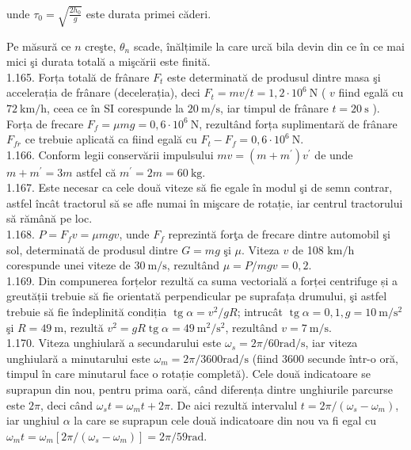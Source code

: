 unde $\tau_{0}=\sqrt{\frac{2 h_{0}}{g}}$ este durata primei căderi.

Pe măsură ce $n$ creşte, $\theta_{n}$ scade, înălțimile la care urcă bila devin din ce în ce mai mici şi durata totală a mişcării este finită.\\
1.165. Forța totală de frânare $F_{t}$ este determinată de produsul dintre masa şi accelerația de frânare (decelerația), deci $F_{t}=m v / t=1,2 \cdot 10^{6} \mathrm{~N}$ ( $v$ fiind egală cu $72 \mathrm{~km} / \mathrm{h}$, ceea ce în SI corespunde la $20 \mathrm{~m} / \mathrm{s}$, iar timpul de frânare $t=20 \mathrm{~s}$ ). Forța de frecare $F_{f}=\mu m g=0,6 \cdot 10^{6} \mathrm{~N}$, rezultând forța suplimentară de frânare $F_{f r}$ ce trebuie aplicată ca fiind egală cu $F_{t}-F_{f}=0,6 \cdot 10^{6} \mathrm{~N}$.\\
1.166. Conform legii conservării impulsului $m v=\left(m+m^{\prime}\right) v^{\prime}$ de unde $m+m^{\prime}=3 m$ astfel că $m^{\prime}=2 m=60 \mathrm{~kg}$.\\
1.167. Este necesar ca cele două viteze să fie egale în modul şi de semn contrar, astfel încât tractorul să se afle numai în mişcare de rotație, iar centrul tractorului să rămână pe loc.\\
1.168. $P=F_{f} v=\mu m g v$, unde $F_{f}$ reprezintă forţa de frecare dintre automobil şi sol, determinată de produsul dintre $G=m g$ şi $\mu$. Viteza $v$ de 108 $\mathrm{km} / \mathrm{h}$ corespunde unei viteze de $30 \mathrm{~m} / \mathrm{s}$, rezultând $\mu=P / m g v=0,2$.\\
1.169. Din compunerea forțelor rezultă ca suma vectorială a forței centrifuge și a greutății trebuie să fie orientată perpendicular pe suprafața drumului, şi astfel trebuie să fie îndeplinită condiția $\operatorname{tg} \alpha=v^{2} / g R$; intrucât $\operatorname{tg} \alpha=0,1, g=10 \mathrm{~m} / \mathrm{s}^{2}$ şi $R=49 \mathrm{~m}$, rezultă $v^{2}=g R \operatorname{tg} \alpha=49 \mathrm{~m}^{2} / \mathrm{s}^{2}$, rezultând $v=7 \mathrm{~m} / \mathrm{s}$.\\
1.170. Viteza unghiulară a secundarului este $\omega_{s}=2 \pi / 60 \mathrm{rad} / \mathrm{s}$, iar viteza unghiulară a minutarului este $\omega_{m}=2 \pi / 3600 \mathrm{rad} / \mathrm{s}$ (fiind 3600 secunde într-o oră, timpul în care minutarul face o rotație completă). Cele două indicatoare se suprapun din nou, pentru prima oară, când diferența dintre unghiurile parcurse este $2 \pi$, deci când $\omega_{s} t=\omega_{m} t+2 \pi$. De aici rezultă intervalul $t=2 \pi /\left(\omega_{s}-\omega_{m}\right)$, iar unghiul $\alpha$ la care se suprapun cele două indicatoare din nou va fi egal cu $\omega_{m} t=\omega_{m}\left[2 \pi /\left(\omega_{s}-\omega_{m}\right)\right]=2 \pi / 59 \mathrm{rad}$.\\
